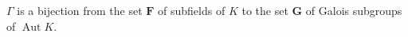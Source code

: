 $\Gamma$ is a bijection from the set $\mathbf{F}$ of subfields of $K$ to the set $\mathbf{G}$ of Galois subgroups of $\operatorname{Aut} K$.

